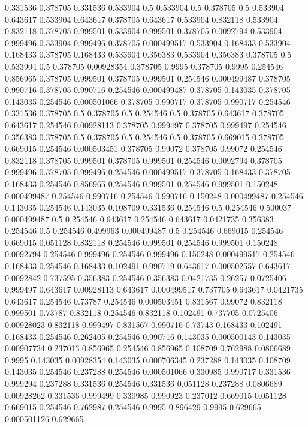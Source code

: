 0.331536 0.378705
0.331536 0.533904
0.5 0.533904
0.5 0.378705
0.5 0.533904
0.643617 0.533904
0.643617 0.378705
0.643617 0.533904
0.832118 0.533904
0.832118 0.378705
0.999501 0.533904
0.999501 0.378705
0.0092794 0.533904
0.999496 0.533904
0.999496 0.378705
0.000499517 0.533904
0.168433 0.533904
0.168433 0.378705
0.168433 0.533904
0.356383 0.533904
0.356383 0.378705
0.5 0.533904
0.5 0.378705
0.00928354 0.378705
0.9995 0.378705
0.9995 0.254546
0.856965 0.378705
0.999501 0.378705
0.999501 0.254546
0.000499487 0.378705
0.990716 0.378705
0.990716 0.254546
0.000499487 0.378705
0.143035 0.378705
0.143035 0.254546
0.000501066 0.378705
0.990717 0.378705
0.990717 0.254546
0.331536 0.378705
0.5 0.378705
0.5 0.254546
0.5 0.378705
0.643617 0.378705
0.643617 0.254546
0.00928113 0.378705
0.999497 0.378705
0.999497 0.254546
0.356383 0.378705
0.5 0.378705
0.5 0.254546
0.5 0.378705
0.669015 0.378705
0.669015 0.254546
0.000503451 0.378705
0.99072 0.378705
0.99072 0.254546
0.832118 0.378705
0.999501 0.378705
0.999501 0.254546
0.0092794 0.378705
0.999496 0.378705
0.999496 0.254546
0.000499517 0.378705
0.168433 0.378705
0.168433 0.254546
0.856965 0.254546
0.999501 0.254546
0.999501 0.150248
0.000499487 0.254546
0.990716 0.254546
0.990716 0.150248
0.000499487 0.254546
0.143035 0.254546
0.143035 0.108709
0.331536 0.254546
0.5 0.254546
0.500037 0.000499487
0.5 0.254546
0.643617 0.254546
0.643617 0.0421735
0.356383 0.254546
0.5 0.254546
0.499963 0.000499487
0.5 0.254546
0.669015 0.254546
0.669015 0.051128
0.832118 0.254546
0.999501 0.254546
0.999501 0.150248
0.0092794 0.254546
0.999496 0.254546
0.999496 0.150248
0.000499517 0.254546
0.168433 0.254546
0.168433 0.102491
0.990719 0.643617
0.000502557 0.643617
0.0092842 0.737595
0.356383 0.254546
0.356383 0.0421735
0.26257 0.0725406
0.999497 0.643617
0.00928113 0.643617
0.000499517 0.737705
0.643617 0.0421735
0.643617 0.254546
0.73787 0.254546
0.000503451 0.831567
0.99072 0.832118
0.999501 0.73787
0.832118 0.254546
0.832118 0.102491
0.737705 0.0725406
0.00928023 0.832118
0.999497 0.831567
0.990716 0.73743
0.168433 0.102491
0.168433 0.254546
0.262405 0.254546
0.990716 0.143035
0.000500143 0.143035
0.00907734 0.237013
0.856965 0.254546
0.856965 0.108709
0.762988 0.0806689
0.9995 0.143035
0.00928354 0.143035
0.000706345 0.237288
0.143035 0.108709
0.143035 0.254546
0.237288 0.254546
0.000501066 0.330985
0.990717 0.331536
0.999294 0.237288
0.331536 0.254546
0.331536 0.051128
0.237288 0.0806689
0.00928262 0.331536
0.999499 0.330985
0.990923 0.237012
0.669015 0.051128
0.669015 0.254546
0.762987 0.254546
0.9995 0.896429
0.9995 0.629665
0.000501126 0.629665
